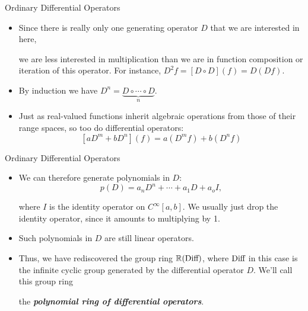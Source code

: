 \begin{frame}
Ordinary Differential Operators
 
\begin{itemize}
 
\item Since there is really only one generating operator $D$ that we are interested in here,
 
we are less interested in multiplication than we are in function
 composition or iteration of this operator. 
For instance,
 $D^2f=[D\circ D](f) = D(Df)$.
 
\item By induction we have $D^n=\underbrace{D\circ\cdots \circ D}_n$.
 
\item Just as real-valued functions inherit algebraic operations from those of their range
 spaces, 
so too do differential operators:
 \[\left[aD^m+bD^n\right](f)=a(D^mf)+b(D^nf)\]

\end{itemize}

\end{frame}



\begin{frame}
Ordinary Differential Operators
 
\begin{itemize}
 
\item We can therefore generate polynomials in $D$:
 \[p(D)=a_nD^n+\cdots +a_1D+a_oI,\]
 
where $I$ is the identity operator on $C^\infty[a,b]$.  We
 usually just drop the identity operator, 
since it amounts to multiplying by 1.
 
\item Such polynomials in $D$ are still linear operators.
 
\item Thus, we have rediscovered the group
 ring $\mathbb{R}(\text{Diff})$, where $\text{Diff}$ in this case is the 
infinite cyclic
 group generated by the differential operator $D$.  We'll call
 this group ring 
 
the \textit{\textbf{polynomial ring of differential operators}}.

\end{itemize}

\end{frame}

